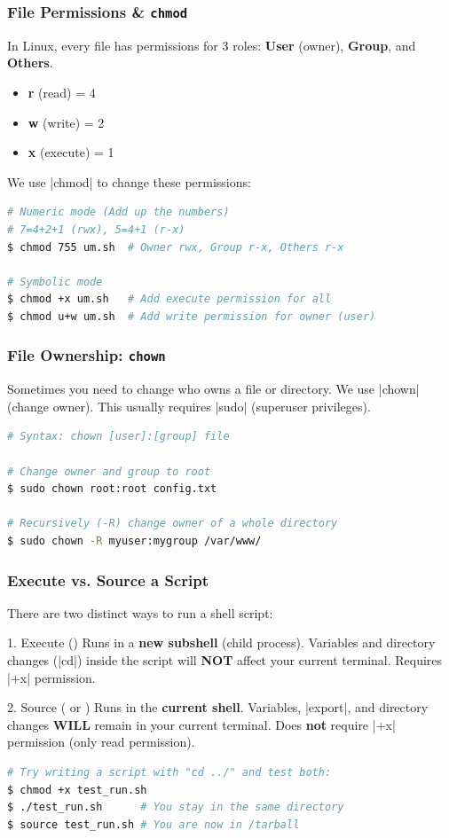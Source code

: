 \begin{frame}[fragile]
\frametitle{File Permissions \& \texttt{chmod}}
In Linux, every file has permissions for 3 roles: \textbf{User} (owner), \textbf{Group}, and \textbf{Others}.
\begin{itemize}
    \item \textbf{r} (read) = 4
    \item \textbf{w} (write) = 2
    \item \textbf{x} (execute) = 1
\end{itemize}
We use \cverb|chmod| to change these permissions:
\begin{lstlisting}[language=bash]
# Numeric mode (Add up the numbers)
# 7=4+2+1 (rwx), 5=4+1 (r-x)
$ chmod 755 um.sh  # Owner rwx, Group r-x, Others r-x

# Symbolic mode
$ chmod +x um.sh   # Add execute permission for all
$ chmod u+w um.sh  # Add write permission for owner (user)
\end{lstlisting}
\end{frame}

\begin{frame}[fragile]
\frametitle{File Ownership: \texttt{chown}}
Sometimes you need to change who owns a file or directory. We use \cverb|chown| (change owner).
\newline \newline
This usually requires \cverb|sudo| (superuser privileges).
\begin{lstlisting}[language=bash]
# Syntax: chown [user]:[group] file

# Change owner and group to root
$ sudo chown root:root config.txt

# Recursively (-R) change owner of a whole directory
$ sudo chown -R myuser:mygroup /var/www/
\end{lstlisting}
\end{frame}

\begin{frame}[fragile]
\frametitle{Execute vs. Source a Script}
There are two distinct ways to run a shell script:
\begin{block}{1. Execute ()}
Runs in a \textbf{new subshell} (child process).
Variables and directory changes (\cverb|cd|) inside the script will \textbf{NOT} affect your current terminal. Requires \cverb|+x| permission.
\end{block}

\begin{block}{2. Source ( or )}
Runs in the \textbf{current shell}.
Variables, \cverb|export|, and directory changes \textbf{WILL} remain in your current terminal. Does \textbf{not} require \cverb|+x| permission (only read permission).
\end{block}

\begin{lstlisting}[language=bash]
# Try writing a script with "cd ../" and test both:
$ chmod +x test_run.sh
$ ./test_run.sh      # You stay in the same directory
$ source test_run.sh # You are now in /tarball
\end{lstlisting}
\end{frame}

